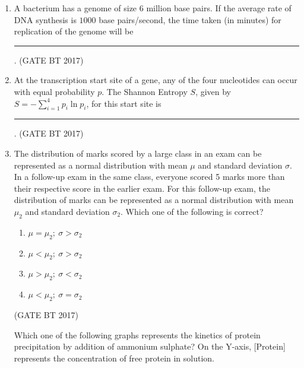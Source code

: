 \documentclass[journal,12pt,onecolumn]{IEEEtran}
\theoremstyle{remark}
\begin{document}
\begin{enumerate}
\item A bacterium has a genome of size $6$ million base pairs. If the average rate of DNA synthesis is $1000$ base pairs/second, the time taken (in minutes) for replication of the genome will be \rule{2cm}{0.4pt}.
\hfill (GATE BT 2017)

\item At the transcription start site of a gene, any of the four nucleotides can occur with equal probability $p$. The Shannon Entropy $S$, given by $S=-\sum_{i=1}^{4} p_{i}\ln p_{i}$, for this start site is \rule{2cm}{0.4pt}.
\hfill (GATE BT 2017)

\item The distribution of marks scored by a large class in an exam can be represented as a normal distribution with mean $\mu$ and standard deviation $\sigma$. In a follow-up exam in the same class, everyone scored 5 marks more than their respective score in the earlier exam. For this follow-up exam, the distribution of marks can be represented as a normal distribution with mean $\mu_{2}$ and standard deviation $\sigma_{2}$. Which one of the following is correct?
\begin{enumerate}
    \item $\mu=\mu_{2};\ \sigma>\sigma_{2}$
    \item $\mu<\mu_{2};\ \sigma>\sigma_{2}$
    \item $\mu>\mu_{2};\ \sigma<\sigma_{2}$
    \item $\mu<\mu_{2};\ \sigma=\sigma_{2}$
\end{enumerate}
\hfill (GATE BT 2017)

Which one of the following graphs represents the kinetics of protein precipitation by addition of ammonium sulphate? On the Y-axis, [Protein] represents the concentration of free protein in solution.


\end{enumerate}
\end{document}
